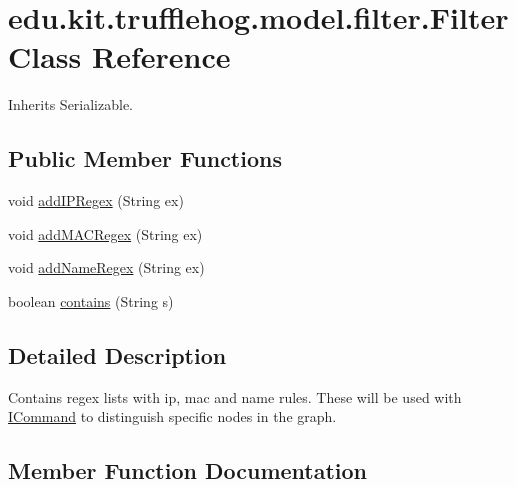\hypertarget{classedu_1_1kit_1_1trufflehog_1_1model_1_1filter_1_1_filter}{}\section{edu.\+kit.\+trufflehog.\+model.\+filter.\+Filter Class Reference}
\label{classedu_1_1kit_1_1trufflehog_1_1model_1_1filter_1_1_filter}


Inherits Serializable.

\subsection*{Public Member Functions}
\begin{DoxyCompactItemize}
\item 
void \hyperlink{classedu_1_1kit_1_1trufflehog_1_1model_1_1filter_1_1_filter_a0013ebc9b381daef4c40bdbc192b0bde}{add\+I\+P\+Regex} (String ex)
\item 
void \hyperlink{classedu_1_1kit_1_1trufflehog_1_1model_1_1filter_1_1_filter_a2b775b62c24d3588cb6d0dd355c11423}{add\+M\+A\+C\+Regex} (String ex)
\item 
void \hyperlink{classedu_1_1kit_1_1trufflehog_1_1model_1_1filter_1_1_filter_a0b2ec576ae9605e324af893a3e5ded2b}{add\+Name\+Regex} (String ex)
\item 
boolean \hyperlink{classedu_1_1kit_1_1trufflehog_1_1model_1_1filter_1_1_filter_af724970317596502110eb39dbc320626}{contains} (String s)
\end{DoxyCompactItemize}


\subsection{Detailed Description}
Contains regex lists with ip, mac and name rules. These will be used with \hyperlink{}{I\+Command} to distinguish specific nodes in the graph. 

\subsection{Member Function Documentation}
\hypertarget{classedu_1_1kit_1_1trufflehog_1_1model_1_1filter_1_1_filter_a0013ebc9b381daef4c40bdbc192b0bde}{}
